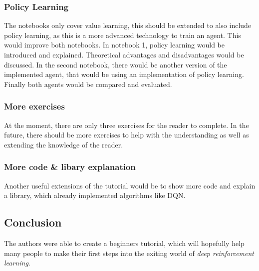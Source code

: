\documentclass[10pt,a4paper]{article}
\begin{document}
	\subsubsection{Policy Learning}
		The notebooks only cover value learning, this should be extended to also include policy learning, as this is a more advanced technology to train an agent. 
		This would improve both notebooks. 
		In notebook 1, policy learning would be introduced and explained.
		Theoretical advantages and disadvantages would be discussed.
		In the second notebook, there would be another version of the implemented agent, that would be using an implementation of policy learning.
		Finally both agents would be compared and evaluated.
		
	\subsubsection{More exercises}
		At the moment, there are only three exercises for the reader to complete. In the future, there should be more exercises to help with the understanding as well as extending the knowledge of the reader.
		
	\subsubsection{More code \& libary explanation}
		Another useful extensions of the tutorial would be to show more code and explain a library, which already implemented algorithms like DQN.
		
	\subsection{Conclusion}
	
	The authors were able to create a beginners tutorial, which will hopefully help many people to make their first steps into the exiting world of \textit{deep reinforcement learning}.
	 
	
\end{document}
